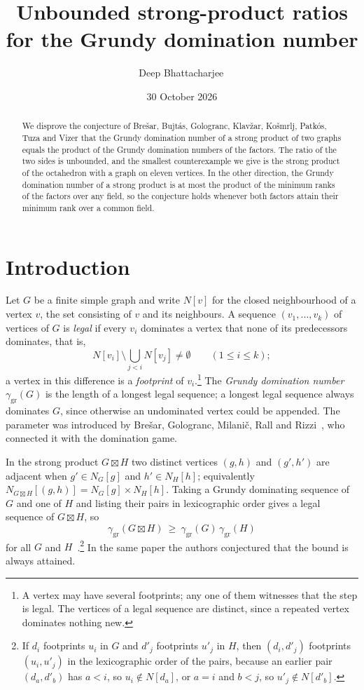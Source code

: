 \documentclass[11pt,a4paper,reqno]{amsart}
\title[Strong-product ratios for the Grundy domination number]{Unbounded strong-product ratios for the Grundy domination number}
\author{Deep Bhattacharjee\,\orcidlink{0000-0003-0466-750X}}
\date{30 October 2026}
\theoremstyle{definition}
\theoremstyle{remark}
\numberwithin{equation}{section}
\newcommand{\ggr}{\gamma_{\mathrm{gr}}}
\newcommand{\sprod}{\boxtimes}
\begin{document}
\begin{abstract}
We disprove the conjecture of Bre\v{s}ar, Bujt\'as, Gologranc, Klav\v{z}ar, Ko\v{s}mrlj, Patk\'os, Tuza and Vizer that the Grundy domination number of a strong product of two graphs equals the product of the Grundy domination numbers of the factors. The ratio of the two sides is unbounded, and the smallest counterexample we give is the strong product of the octahedron with a graph on eleven vertices. In the other direction, the Grundy domination number of a strong product is at most the product of the minimum ranks of the factors over any field, so the conjecture holds whenever both factors attain their minimum rank over a common field.
\end{abstract}

\maketitle

\section{Introduction}\label{sec:intro}

\enlargethispage{2pt}
Let $G$ be a finite simple graph and write $N[v]$ for the closed neighbourhood of a vertex $v$, the set consisting of $v$ and its neighbours. A sequence $(v_1,\dots,v_k)$ of vertices of $G$ is \emph{legal} if every $v_i$ dominates a vertex that none of its predecessors dominates, that is,
\[
  N[v_i]\setminus\bigcup_{j<i}N[v_j]\neq\emptyset\qquad(1\le i\le k);
\]
a vertex in this difference is a \emph{footprint} of $v_i$.\footnote{A vertex may have several footprints; any one of them witnesses that the step is legal. The vertices of a legal sequence are distinct, since a repeated vertex dominates nothing new.} The \emph{Grundy domination number} $\ggr(G)$ is the length of a longest legal sequence; a longest legal sequence always dominates $G$, since otherwise an undominated vertex could be appended. The parameter was introduced by Bre\v{s}ar, Gologranc, Milani\v{c}, Rall and Rizzi~\cite{BGMRR}, who connected it with the domination game.

In the strong product $G\sprod H$ two distinct vertices $(g,h)$ and $(g',h')$ are adjacent when $g'\in N_G[g]$ and $h'\in N_H[h]$; equivalently $N_{G\sprod H}[(g,h)]=N_G[g]\times N_H[h]$. Taking a Grundy dominating sequence of $G$ and one of $H$ and listing their pairs in lexicographic order gives a legal sequence of $G\sprod H$, so
\begin{equation}\label{eq:lower}
  \ggr(G\sprod H)\ \ge\ \ggr(G)\,\ggr(H)
\end{equation}
for all $G$ and $H$~\cite[Proposition~21]{BBG}.\footnote{If $d_i$ footprints $u_i$ in $G$ and $d'_j$ footprints $u'_j$ in $H$, then $(d_i,d'_j)$ footprints $(u_i,u'_j)$ in the lexicographic order of the pairs, because an earlier pair $(d_a,d'_b)$ has $a<i$, so $u_i\notin N[d_a]$, or $a=i$ and $b<j$, so $u'_j\notin N[d'_b]$.} In the same paper the authors conjectured that the bound is always attained.
\end{document}
